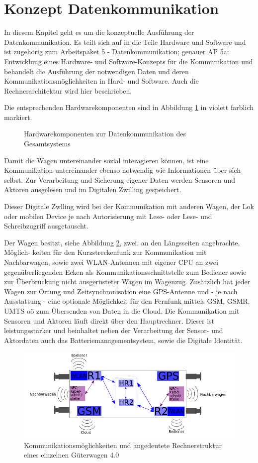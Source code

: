 \section{Konzept Datenkommunikation}\label{sec:dKomp}
In diesem Kapitel geht es um die konzeptuelle Ausführung der Datenkommunikation. Es teilt sich auf in die Teile Hardware und Software und ist zugehörig zum Arbeitspaket 5 - Datenkommunikation; genauer AP 5a: Entwicklung eines Hardware- und Software-Konzepts für die Kommunikation und behandelt die Ausführung der notwendigen Daten und deren Kommunikationsmöglichkeiten in Hard- und Software.  Auch die Rechnerarchitektur wird hier beschrieben.\par
Die entsprechenden Hardwarekomponenten sind in Abbildung \ref{fig:dKomp} in violett farblich markiert.
\begin{figure}[hbt]
    \centering
    
    \caption{Hardwarekomponenten zur Datenkommunikation des Gesamtsystems}
    \label{fig:dKomp}
\end{figure}
Damit die Wagen untereinander sozial interagieren können, ist eine Kommunikation untereinander ebenso notwendig wie Informationen über sich selbst. Zur Verarbeitung und Sicherung eigener Daten werden Sensoren und Aktoren ausgelesen und im Digitalen Zwilling gespeichert.\par
Dieser Digitale Zwlling wird bei der Kommunikation mit anderen Wagen, der Lok oder mobilen Device je nach Autorisierung mit Lese- oder Lese- und Schreibzugriff ausgetauscht.\par
Der Wagen besitzt, siehe Abbildung \ref{fig:Wagenkomm}, zwei, an den Längsseiten angebrachte, Möglich- keiten für den Kurzstreckenfunk zur Kommunikation mit Nachbarwagen, sowie zwei WLAN-Antennen mit eigener CPU an zwei gegenüberliegenden Ecken als Kommunikationsschnittstelle zum Bediener sowie zur Überbrückung nicht ausgerüsteter Wagen im \gls{Wagenzug}. Zusätzlich hat jeder Wagen zur Ortung und Zeitsynchronisation eine GPS-Antenne und - je nach Ausstattung - eine optionale Möglichkeit für den Fernfunk mittels GSM, GSMR, UMTS oö zum Übersenden von Daten in die Cloud. Die Kommunikation mit Sensoren und Aktoren läuft direkt über den Hauptrechner. Dieser ist leistungsstärker und beinhaltet neben der Verarbeitung der Sensor- und Aktordaten auch das Batteriemanagementsystem, sowie die Digitale Identität.\par
\begin{figure}[hbt]
    \centering
    \includegraphics[width=\textwidth]{Bilder/wagen_draufsicht.png}
    \caption{Kommunikationsmöglichkeiten und angedeutete Rechnerstruktur eines einzelnen Güterwagen 4.0}
    \label{fig:Wagenkomm}
\end{figure}
